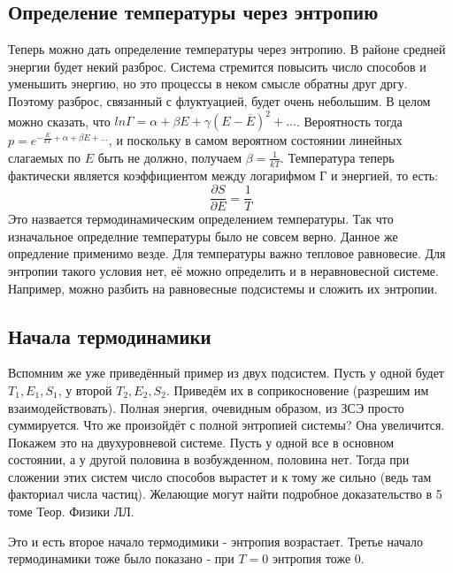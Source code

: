 \documentclass[a4paper, 12pt]{article}
\begin{document}
	\subsection{Определение температуры через энтропию}
	Теперь можно дать определение температуры через энтропию. В районе средней энергии будет некий разброс. Система стремится повысить число способов и уменьшить энергию, но это процессы в неком смысле обратны друг дргу. Поэтому разброс, связанный с флуктуацией, будет очень небольшим. 
	В целом можно сказать, что $ln \Gamma = \alpha + \beta E + \gamma (E-\overline{E})^{2} + ...$. Вероятность тогда $p = e^{-\frac{E}{kT} + \alpha +\beta E + ...} $, и поскольку в самом вероятном состоянии линейных слагаемых по $E$ быть не должно, получаем $\beta = \frac{1}{kT}$. Температура теперь фактически является коэффициентом между логарифмом Г и энергией, то есть:
	\begin{equation*}
		\frac{\partial S }{\partial E} = \frac{1}{T}
	\end{equation*}
	Это назвается термодинамическим определением температуры. Так что изначальное определние температуры было не совсем верно. Данное же опредление применимо везде.  
	Для температуры важно тепловое равновесие. Для энтропии такого условия нет, её можно определить и в неравновесной системе. Например, можно разбить на равновесные подсистемы и сложить их энтропии. 
	\subsection{Начала термодинамики}
	Вспомним же уже приведённый пример из двух подсистем. Пусть у одной будет $T_{1}, E_{1}, S_{1}$, у второй $T_{2}, E_{2}, S_{2}$. Приведём их в соприкосновение (разрешим им взаимодействовать). Полная энергия, очевидным образом, из ЗСЭ просто суммируется. Что же произойдёт с полной энтропией системы? Она увеличится. Покажем это на двухуровневой системе. Пусть у одной все в основном состоянии, а у другой половина в возбужденном, половина нет. Тогда при сложении этих систем число способов вырастет и к тому же сильно (ведь там факториал числа
	частиц). Желающие могут найти подробное доказательство в 5 томе Теор. Физики ЛЛ. 
	
	Это и есть второе начало термодимики - энтропия возрастает. Третье начало термодинамики тоже было показано - при $T = 0$ энтропия тоже 0.
	
\end{document}

